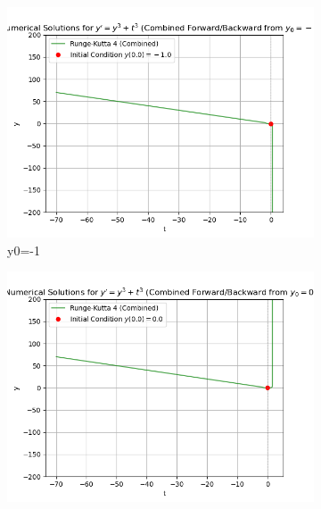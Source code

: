 \documentclass{article}
\begin{document}
\begin{figure}[htb] %
    \centering %

    \begin{subfigure}[b]{0.3\linewidth} %
        \centering
        \includegraphics[width=\linewidth]{pic/kutta-1.png} %
        \caption{y0=-1} %
        \label{fig:kutta-1} %
    \end{subfigure}
    \hfill %
    \begin{subfigure}[b]{0.3\linewidth}
        \centering
        \includegraphics[width=\linewidth]{pic/kutta0.png}

\end{subfigure}
\end{figure}
\end{document}
